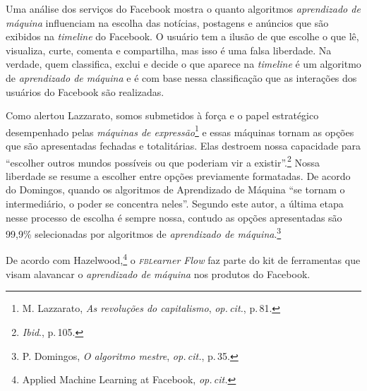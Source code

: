 Uma análise dos serviços do Facebook mostra o quanto algoritmos
\textit{aprendizado de máquina} influenciam na escolha das notícias, postagens e
anúncios que são exibidos na \textit{timeline} do Facebook. O usuário tem
a ilusão de que escolhe o que lê, visualiza, curte, comenta e
compartilha, mas isso é uma falsa liberdade. Na verdade, quem
classifica, exclui e decide o que aparece na \textit{timeline} é um
algoritmo de \textit{aprendizado de máquina} e é com base nessa classificação que
as interações dos usuários do Facebook são realizadas.

Como alertou Lazzarato, somos submetidos à força e o papel
estratégico desempenhado pelas \textit{máquinas de expressão}\footnote{M. Lazzarato, \textit{As revoluções do capitalismo}, \textit{op.\,cit.}, p.\,81.} e essas
máquinas tornam as opções que são apresentadas fechadas e
totalitárias. Elas destroem nossa capacidade para ``escolher outros
mundos possíveis ou que poderiam vir a existir''.\footnote{\textit{Ibid}., p.\,105.} Nossa
liberdade se resume a escolher entre opções previamente formatadas. De
acordo do Domingos, quando os algoritmos de Aprendizado de
Máquina ``se tornam o intermediário, o poder se concentra neles''.
Segundo este autor, a última etapa nesse processo de escolha é sempre
nossa, contudo as opções apresentadas são 99,9\% selecionadas por
algoritmos de \textit{aprendizado de máquina}.\footnote{P. Domingos, \textit{O algoritmo mestre}, \textit{op.\,cit.}, p.\,35.}

De acordo com Hazelwood,\footnote{Applied Machine Learning at Facebook, \textit{op.\,cit.}} o \textit{\textsc{fbl}earner Flow} faz parte do kit de ferramentas que visam alavancar o \textit{aprendizado de máquina}
nos produtos do Facebook.



